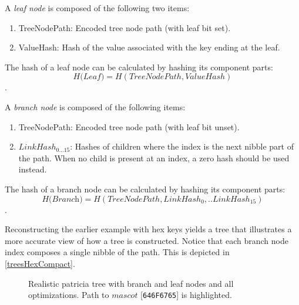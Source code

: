 A \emph{leaf node} is composed of the following two items:
\begin{enumerate}
	\item{TreeNodePath: Encoded tree node path (with leaf bit set).}
	\item{ValueHash: Hash of the value associated with the key ending at the leaf.}
\end{enumerate}

The hash of a leaf node can be calculated by hashing its component parts: $$\textit{H(Leaf)}=H(TreeNodePath, ValueHash)$$.

A \emph{branch node} is composed of the following items:
\begin{enumerate}
	\item{TreeNodePath: Encoded tree node path (with leaf bit unset).}
	\item{$LinkHash_{0...15}$: Hashes of children where the index is the next nibble part of the path.
	When no child is present at an index, a zero hash should be used instead.}
\end{enumerate}

The hash of a branch node can be calculated by hashing its component parts: $$\textit{H(Branch)}=H(TreeNodePath, LinkHash_0,..LinkHash_{15})$$.

Reconstructing the earlier example with hex keys yields a tree that illustrates a more accurate view of how a \codenamespace tree is constructed.
Notice that each branch node index composes a single nibble of the path.
This is depicted in \autoref{treesHexCompact}.

\begin{figure}[ht]
	\begin{center}
		\caption{
			Realistic patricia tree with branch and leaf nodes and all optimizations.
			Path to $mascot$ [\texttt{646F6765}] is highlighted.
		}
		\label{treesHexCompact}
	\end{center}
\end{figure}

